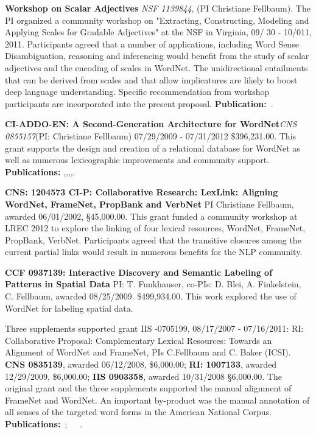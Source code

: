 \documentclass[10pt]{article}
\newcommand{\miniskip}{\vspace*{1mm}}
\begin{document}
\miniskip\noindent
{\bf Workshop on Scalar Adjectives}
{\it  NSF   1139844}, (PI Christiane Fellbaum).  The PI organized a community workshop on "Extracting, Constructing, 
Modeling and Applying Scales for Gradable Adjectives" at the NSF in Virginia, 09/ 30 - 10/011, 2011. Participants agreed that a number of applications, including  
Word Sense Disambiguation,  reasoning and inferencing would benefit 
from the study of scalar adjectives and the encoding of scales in WordNet. The
unidirectional entailments that can be derived from scales and that allow implicatures are
likely to boost deep language understanding. Specific recommendation from workshop participants 
are incorporated into the present proposal. {\bf Publication:}~\cite{sheinmanetal2013}.

\miniskip\noindent
{\bf CI-ADDO-EN: A Second-Generation Architecture for WordNet}{\it CNS 0855157}(PI: Christiane Fellbaum) 07/29/2009 - 07/31/2012
\$396,231.00. This grant supports the design and creation of a relational database for WordNet as well as numerous lexicographic improvements 
and community support. {\bf Publications:} \cite{fellbaumvossen2012},\cite{fellbaumencyclopedia},\cite{fellbaumontology2010},\cite{chiarcosinpress},\cite{nikolova2012}.

\miniskip\noindent
{\bf CNS: 1204573 CI-P: Collaborative Research: LexLink: Aligning WordNet, FrameNet, PropBank and VerbNet} PI Christiane Fellbaum, awarded 06/01/2002, 
\S45,000.00. This grant funded a community workshop at LREC 2012 to explore the linking of four lexical resources, WordNet, FrameNet, PropBank, VerbNet. 
Participants agreed that the transitive closures among the current partial links would result in numerous benefits for the NLP community. 

\miniskip\noindent
{\bf CCF 0937139: Interactive Discovery and Semantic Labeling of Patterns in Spatial Data} PI: T. Funkhauser, co-PIs: D. Blei, A. Finkelstein, C. Fellbaum, awarded 08/25/2009.
\$499,934.00. This work explored the use of WordNet for labeling spatial data. 

\miniskip\noindent
Three supplements supported grant IIS -0705199, 08/17/2007 - 07/16/2011: RI: Collaborative Proposal: Complementary Lexical Resources: 
Towards an Alignment of WordNet and FrameNet, PIs C.Fellbaum and C. Baker (ICSI). 
{\bf CNS 0835139}, awarded 06/12/2008, \$6,000.00; {\bf RI: 1007133}, awarded 12/29/2009, \$6,000.00; {\bf IIS 0903358}, awarded 10/31/2008 \S6,000.00. 
The original grant and the three supplements supported the manual alignment of FrameNet and WordNet. An important by-product was the manual 
annotation of all senses of the targeted word forms in the American National Corpus. {\bf Publications:}~\cite{fellbaumbakerLRE};~\cite{bakerfellbaum2008}~\cite{bakerfellbaum2009}~\cite{demelo2012}.
\end{document}
